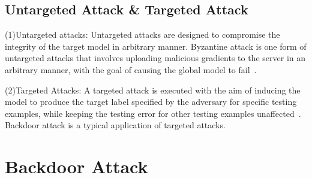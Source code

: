 \documentclass[pdflatex,sn-mathphys-num]{sn-jnl}%
\theoremstyle{thmstyleone}%
\theoremstyle{thmstyletwo}%
\theoremstyle{thmstylethree}%
\begin{document}
\subsection{Untargeted Attack \& Targeted Attack}
(1)Untargeted attacks: Untargeted attacks are designed
to compromise the integrity of the target model in
arbitrary manner. Byzantine attack is one form of untargeted
attacks that involves uploading malicious gradients to the
server in an arbitrary manner, with the goal of causing
the global model to fail~\cite{lamport2019byzantine,xie2020fall,bernstein2018signsgd,damaskinos2019aggregathor}.

(2)Targeted Attacks: A targeted attack is executed with
the aim of inducing the model to produce the target label
specified by the adversary for specific testing examples,
while keeping the testing error for other testing examples
unaffected~\cite{damaskinos2019aggregathor}. Backdoor attack is a typical application
of targeted attacks. 


\section{Backdoor Attack}
\label{Backdoor Attack}
\end{document}

